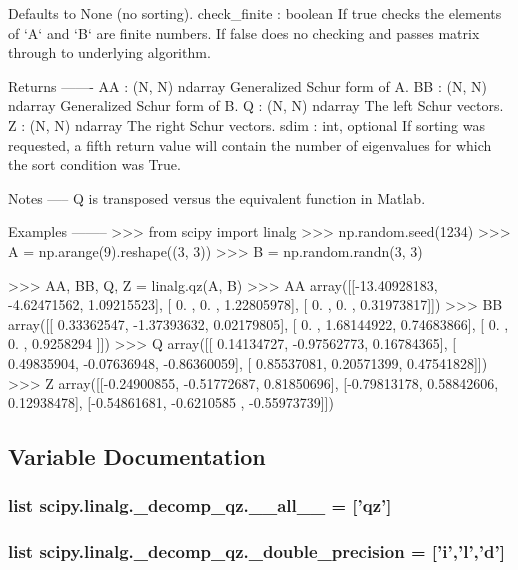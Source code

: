 \begin{DoxyVerb}
    Defaults to None (no sorting).
check_finite : boolean
    If true checks the elements of `A` and `B` are finite numbers. If
    false does no checking and passes matrix through to
    underlying algorithm.

Returns
-------
AA : (N, N) ndarray
    Generalized Schur form of A.
BB : (N, N) ndarray
    Generalized Schur form of B.
Q : (N, N) ndarray
    The left Schur vectors.
Z : (N, N) ndarray
    The right Schur vectors.
sdim : int, optional
    If sorting was requested, a fifth return value will contain the
    number of eigenvalues for which the sort condition was True.

Notes
-----
Q is transposed versus the equivalent function in Matlab.

Examples
--------
>>> from scipy import linalg
>>> np.random.seed(1234)
>>> A = np.arange(9).reshape((3, 3))
>>> B = np.random.randn(3, 3)

>>> AA, BB, Q, Z = linalg.qz(A, B)
>>> AA
array([[-13.40928183,  -4.62471562,   1.09215523],
       [  0.        ,   0.        ,   1.22805978],
       [  0.        ,   0.        ,   0.31973817]])
>>> BB
array([[ 0.33362547, -1.37393632,  0.02179805],
       [ 0.        ,  1.68144922,  0.74683866],
       [ 0.        ,  0.        ,  0.9258294 ]])
>>> Q
array([[ 0.14134727, -0.97562773,  0.16784365],
       [ 0.49835904, -0.07636948, -0.86360059],
       [ 0.85537081,  0.20571399,  0.47541828]])
>>> Z
array([[-0.24900855, -0.51772687,  0.81850696],
       [-0.79813178,  0.58842606,  0.12938478],
       [-0.54861681, -0.6210585 , -0.55973739]])\end{DoxyVerb}
 

\subsection{Variable Documentation}
\hypertarget{namespacescipy_1_1linalg_1_1__decomp__qz_ad6afb55518ac381c6cd149135ac89423}{}
\subsubsection[{\+\_\+\+\_\+all\+\_\+\+\_\+}]{\setlength{\rightskip}{0pt plus 5cm}list scipy.\+linalg.\+\_\+decomp\+\_\+qz.\+\_\+\+\_\+all\+\_\+\+\_\+ = \mbox{[}'{\bf qz}'\mbox{]}}\label{namespacescipy_1_1linalg_1_1__decomp__qz_ad6afb55518ac381c6cd149135ac89423}
\hypertarget{namespacescipy_1_1linalg_1_1__decomp__qz_a8f04cb345ce9438d09ccc175dc20c1fa}{}
\subsubsection[{\+\_\+double\+\_\+precision}]{\setlength{\rightskip}{0pt plus 5cm}list scipy.\+linalg.\+\_\+decomp\+\_\+qz.\+\_\+double\+\_\+precision = \mbox{[}'{\bf i}','{\bf l}','d'\mbox{]}}\label{namespacescipy_1_1linalg_1_1__decomp__qz_a8f04cb345ce9438d09ccc175dc20c1fa}
